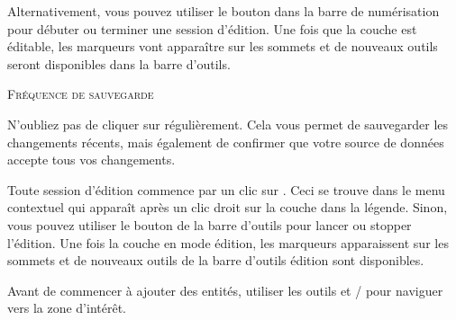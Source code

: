 Alternativement, vous pouvez utiliser le bouton  dans la barre de numérisation pour débuter ou terminer une session d'édition. Une fois que la couche est éditable, les marqueurs vont apparaître sur les sommets et de nouveaux outils seront disponibles dans la barre d'outils.

\begin{Tip}[ht]\caption{\textsc{Fréquence de sauvegarde}}
N'oubliez pas de cliquer sur  régulièrement. Cela vous permet de sauvegarder les changements récents, mais également de confirmer que votre source de données accepte tous vos changements.
\end{Tip}

Toute session d'édition commence par un clic sur . Ceci se trouve dans le menu contextuel qui apparaît après un clic droit sur la couche dans la légende. Sinon, vous pouvez utiliser le bouton   de la barre d'outils pour lancer ou stopper l'édition.  Une fois la couche en mode édition, les marqueurs apparaissent sur les sommets et de nouveaux outils de la barre d'outils édition sont disponibles.

 

Avant de commencer à ajouter des entités, utiliser les outils  et / pour naviguer vers la zone d'intérêt.

